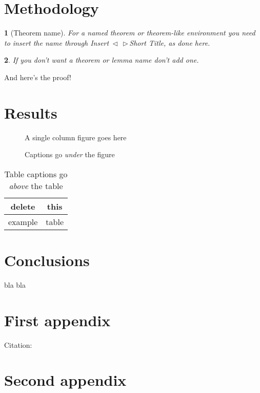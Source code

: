 \documentclass[twocolumn,english]{IEEEtran}
\makeatletter
\DeclareRobustCommand*{\lyxarrow}{%
\@ifstar
{\leavevmode\,$\triangleleft$\,\allowbreak}
{\leavevmode\,$\triangleright$\,\allowbreak}}
\providecommand{\tabularnewline}{\\}
\theoremstyle{plain}
\newtheorem{thm}{\protect\theoremname}
\theoremstyle{plain}
\newtheorem{lem}[thm]{\protect\lemmaname}
\providecommand{\lemmaname}{Lemma}
\providecommand{\theoremname}{Theorem}
\makeatother
\begin{document}
\section{Methodology}
\begin{thm}[Theorem name]
For a named theorem or theorem-like environment you need to insert
the name through \textsf{Insert\lyxarrow{}Short Title}, as done here.\end{thm}
\begin{lem}
If you don't want a theorem or lemma name don't add one.\end{lem}
\begin{IEEEproof}
And here's the proof!
\end{IEEEproof}

\section{Results}

\begin{figure}[htbp]
\begin{centering}
\textsf{A single column figure goes here}
\par\end{centering}

\caption{Captions go \emph{under} the figure}
\end{figure}
\begin{table}[htbp]
\caption{Table captions go \emph{above} the table}


\centering{}%
\begin{tabular}{|c|c|}
\hline 
delete & this\tabularnewline
\hline 
\hline 
example & table\tabularnewline
\hline 
\end{tabular}
\end{table}



\section{Conclusions}

bla bla


\appendices{}


\section{First appendix}

Citation: \cite{IEEEexample:beebe_archive}


\section{Second appendix}
\end{document}
